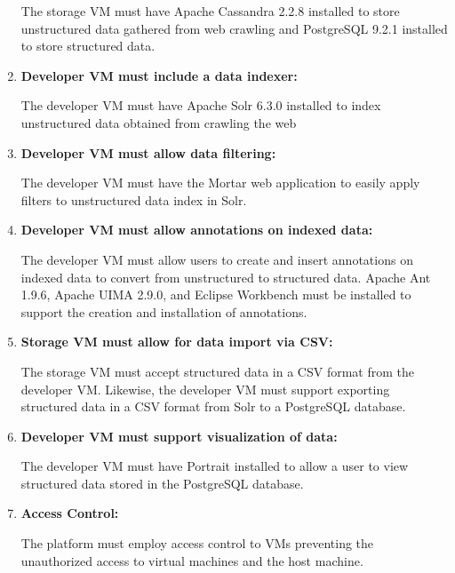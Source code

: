 \begin{enumerate}[label=\textbf{FR-\arabic*}]
  The storage VM must have Apache Cassandra 2.2.8 installed to store
  unstructured data gathered from web crawling and PostgreSQL 9.2.1
  installed to store structured data.

\item \textbf{Developer VM must include a data indexer:}

  The developer VM must have Apache Solr 6.3.0 installed to index 
  unstructured data obtained from crawling the web

\item \textbf{Developer VM must allow data filtering:}

  The developer VM must have the Mortar web application to easily
  apply filters to unstructured data index in Solr.

\item \textbf{Developer VM must allow annotations on indexed data:}

  The developer VM must allow users to create and insert annotations 
  on indexed data to convert from unstructured to structured data. 
  Apache Ant 1.9.6, Apache UIMA 2.9.0, and Eclipse Workbench must be
  installed to support the creation and installation of annotations.

\item \textbf{Storage VM must allow for data import via CSV:}

  The storage VM must accept structured data in a CSV format from 
  the developer VM. Likewise, the developer VM must support exporting
  structured data in a CSV format from Solr to a PostgreSQL database.

\item \textbf{Developer VM must support visualization of data:}

  The developer VM must have Portrait installed to allow a user to
  view structured data stored in the PostgreSQL database.

\item \textbf{Access Control:}

  The platform must employ access control to VMs preventing the
  unauthorized access to virtual machines and the host machine.


\end{enumerate}

